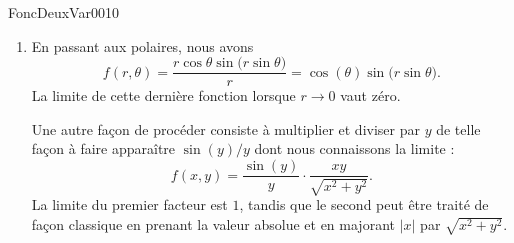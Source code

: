 \begin{corrige}{FoncDeuxVar0010}
\begin{enumerate}
		\item
			En passant aux polaires, nous avons
			\begin{equation}
				f(r,\theta)=\frac{ r\cos\theta\sin\big( r\sin\theta \big) }{ r }=\cos(\theta)\sin\big( r\sin\theta \big).
			\end{equation}
			La limite de cette dernière fonction lorsque $r\to 0$ vaut zéro.

			Une autre façon de procéder consiste à multiplier et diviser par $y$ de telle façon à faire apparaître $\sin(y)/y$ dont nous connaissons la limite :
			\begin{equation}
				f(x,y)=\frac{ \sin(y) }{ y }\cdot\frac{ xy }{ \sqrt{x^2+y^2} }.
			\end{equation}
			La limite du premier facteur est $1$, tandis que le second peut être traité de façon classique en prenant la valeur absolue et en majorant $| x |$ par $\sqrt{x^2+y^2}$.
			
	\end{enumerate}


\end{corrige}
